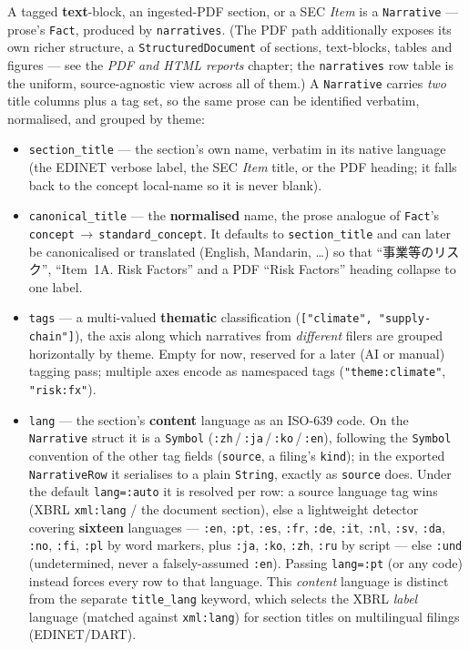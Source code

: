 \documentclass[11pt,a4paper]{report}
\newcommand{\jpcjk}[2]{{\cjkJPfont #1}}
\begin{document}
\noindent A tagged \textbf{text}-block, an ingested-PDF section, or a SEC \emph{Item} is a \texttt{Narrative}
--- prose's \texttt{Fact}, produced by \texttt{narratives}. (The PDF path additionally exposes its own richer
structure, a \texttt{StructuredDocument} of sections, text-blocks, tables and figures --- see the \emph{PDF
and HTML reports} chapter; the \texttt{narratives} row table is the uniform, source-agnostic view across all
of them.) A \texttt{Narrative} carries \emph{two} title columns plus a tag set, so the same prose can be
identified verbatim, normalised, and grouped by theme:
\begin{itemize}[nosep]
  \item \texttt{section\_title} --- the section's own name, verbatim in its native language (the EDINET
    verbose label, the SEC \emph{Item} title, or the PDF heading; it falls back to the concept local-name so
    it is never blank).
  \item \texttt{canonical\_title} --- the \textbf{normalised} name, the prose analogue of \texttt{Fact}'s
    \texttt{concept}\,$\to$\,\texttt{standard\_concept}. It defaults to \texttt{section\_title} and can later
    be canonicalised or translated (English, Mandarin, \ldots) so that ``\jpcjk{事業等のリスク}{}'', ``Item~1A.
    Risk Factors'' and a PDF ``Risk Factors'' heading collapse to one label.
  \item \texttt{tags} --- a multi-valued \textbf{thematic} classification (\texttt{["climate",
    "supply-chain"]}), the axis along which narratives from \emph{different} filers are grouped horizontally
    by theme. Empty for now, reserved for a later (AI or manual) tagging pass; multiple axes encode as
    namespaced tags (\texttt{"theme:climate"}, \texttt{"risk:fx"}).
  \item \texttt{lang} --- the section's \textbf{content} language as an ISO-639 code. On the \texttt{Narrative}
    struct it is a \texttt{Symbol} (\texttt{:zh}\,/\,\texttt{:ja}\,/\,\texttt{:ko}\,/\,\texttt{:en}), following
    the \texttt{Symbol} convention of the other tag fields (\texttt{source}, a filing's \texttt{kind}); in the
    exported \texttt{NarrativeRow} it serialises to a plain \texttt{String}, exactly as \texttt{source} does.
    Under the default \texttt{lang=:auto} it is resolved per row: a source language tag wins (XBRL
    \texttt{xml:lang} / the document section), else a lightweight detector covering \textbf{sixteen}
    languages --- \texttt{:en}, \texttt{:pt}, \texttt{:es}, \texttt{:fr}, \texttt{:de}, \texttt{:it},
    \texttt{:nl}, \texttt{:sv}, \texttt{:da}, \texttt{:no}, \texttt{:fi}, \texttt{:pl} by word markers, plus
    \texttt{:ja}, \texttt{:ko}, \texttt{:zh}, \texttt{:ru} by script --- else \texttt{:und} (undetermined,
    never a falsely-assumed \texttt{:en}). Passing \texttt{lang=:pt} (or any code) instead forces every row
    to that language. This \emph{content} language is distinct from the separate \texttt{title\_lang} keyword,
    which selects the XBRL \emph{label} language (matched against \texttt{xml:lang}) for section titles on
    multilingual filings (EDINET/DART).
\end{itemize}
\end{document}

